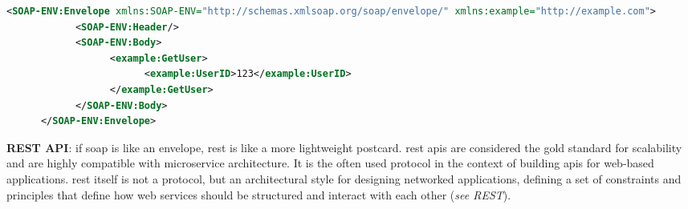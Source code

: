\begin{lstlisting}[language=XML, caption=Example of a SOAP request, label=lst:soaprequest]
      <SOAP-ENV:Envelope xmlns:SOAP-ENV="http://schemas.xmlsoap.org/soap/envelope/" xmlns:example="http://example.com">
            <SOAP-ENV:Header/>
            <SOAP-ENV:Body>
                  <example:GetUser>
                        <example:UserID>123</example:UserID>
                  </example:GetUser>
            </SOAP-ENV:Body>
      </SOAP-ENV:Envelope>
\end{lstlisting}

\begin{multicols}{2}
      \textbf{REST API}: if \acrshort{soap} is like an envelope, \acrshort{rest} is like a  more lightweight postcard.
      \acrshort{rest} \acrshort{api}s are considered the gold standard for scalability and are highly compatible with
      microservice architecture. It is the often used protocol in the context of building \acrshort{api}s for web-based
      applications. \acrshort{rest} itself is not a protocol, but an architectural style for designing networked
      applications, defining a set of constraints and principles that define how web services should be structured
      and interact with each other (\textit{see \gls{REST}}).


\end{multicols}

